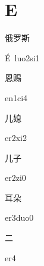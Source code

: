 ﻿%
\section*{E}

\begin{verbete}[É\ luo2si1]{俄罗斯}
\begin{pronuncia}{É\ luo2si1}
\end{pronuncia}
\end{verbete}

\begin{verbete}[en1ci4]{恩赐}
\begin{pronuncia}{en1ci4}
\end{pronuncia}
\end{verbete}

\begin{verbete}[er2xi2]{儿媳}
\begin{pronuncia}{er2xi2}
\end{pronuncia}
\end{verbete}

\begin{verbete}[er2zi0]{儿子}
\begin{pronuncia}{er2zi0}
\end{pronuncia}
\end{verbete}

\begin{verbete}[er3duo0]{耳朵}
\begin{pronuncia}{er3duo0}
\end{pronuncia}
\end{verbete}

\begin{verbete}[er4]{二}
\begin{pronuncia}{er4}
\end{pronuncia}
\end{verbete}

